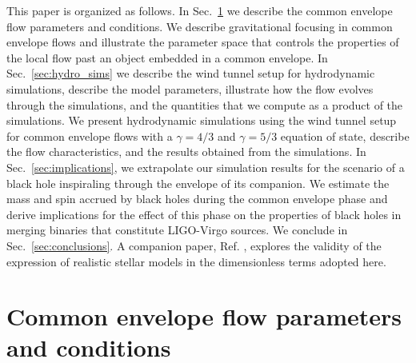 This paper is organized as follows. In Sec.~\ref{sec:CE_params} we describe the common envelope flow parameters and conditions. We describe gravitational focusing in common envelope flows and illustrate the parameter space that controls the properties of the local flow past an object embedded in a common envelope. In Sec.~\ref{sec:hydro_sims} we describe the wind tunnel setup for hydrodynamic simulations, describe the model parameters, illustrate how the flow evolves through the simulations, and the quantities that we compute as a product of the simulations. We present hydrodynamic simulations using the wind tunnel setup for common envelope flows with a $\gamma = 4/3$ and $\gamma = 5/3$ equation of state, describe the flow characteristics, and the results obtained from the simulations. In Sec.~\ref{sec:implications}, we extrapolate our simulation results for the scenario of a black hole inspiraling through the envelope of its companion. We estimate the mass and spin accrued by black holes during the common envelope phase and derive implications for the effect of this phase on the properties of black holes in merging binaries that constitute LIGO-Virgo sources.
We conclude in Sec.~\ref{sec:conclusions}. A companion paper, Ref. \cite{Everson:2020eeq}, explores the validity of the expression of realistic stellar models in the dimensionless terms adopted here.

\vspace{5mm}
\section{Common envelope flow parameters and conditions}\label{sec:CE_params} 

